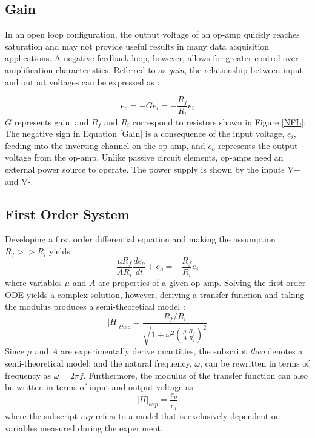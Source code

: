\documentclass[letterpaper,12pt]{article}
\begin{document}
\subsection{Gain}
In an open loop configuration, the output voltage of an op-amp quickly reaches saturation and may not provide useful results in many data acquisition applications. A negative feedback loop, however, allows for greater control over amplification characteristics. Referred to as \textit{gain}, the relationship between input and output voltages can be expressed as :

\begin{equation}
    \label{Gain}
    e_o = -Ge_i = -\frac{R_f}{R_i}e_i
\end{equation}
$G$ represents gain, and $R_f$ and $R_i$ correspond to resistors shown in Figure \ref{NFL}. The negative sign in Equation \ref{Gain} is a consequence of the input voltage, $e_i$, feeding into the inverting channel on the op-amp, and $e_o$ represents the output voltage from the op-amp. Unlike passive circuit elements, op-amps need an external power source to operate. The power supply is shown by the inputs V+ and V-.

\subsection{First Order System}
Developing a first order differential equation and making the assumption $R_f >> R_i$ yields 
\begin{equation}
    \label{1stOrder}
    \frac{\mu R_f}{A R_i}\frac{de_o}{dt} + e_o = -\frac{R_f}{R_i}e_i 
\end{equation}
where variables $\mu$ and $A$ are properties of a given op-amp. Solving the first order ODE yields a complex solution, however, deriving a transfer function and taking the modulus produces a semi-theoretical model : 
\begin{equation}
    \label{Htheo}
    |H|_{theo} = \frac{R_f/R_i}{\sqrt{1 + \omega^2(\frac{\mu}{A}\frac{R_f}{R_i})^2}}
\end{equation}
Since $\mu$ and $A$ are experimentally derive quantities, the subscript \textit{theo} denotes a semi-theoretical model, and the natural frequency, $\omega$, can be rewritten in terms of frequency as $\omega = 2\pi f$. Furthermore, the modulus of the transfer function can also be written in terms of input and output voltage as
\begin{equation}
    \label{Hexp}
    |H|_{exp} = \frac{e_o}{e_i}
\end{equation}
where the subscript \textit{exp} refers to a model that is exclusively dependent on variables measured during the experiment.
\end{document}
